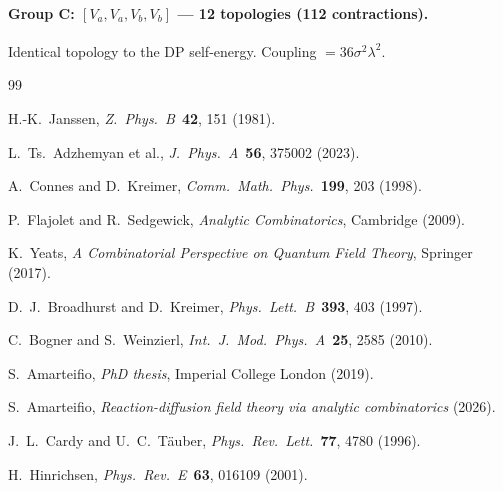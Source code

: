 \documentclass[11pt,a4paper]{article}
\theoremstyle{definition}
\begin{document}
\paragraph{Group C: $[V_a, V_a, V_b, V_b]$ --- 12 topologies (112 contractions).}
Identical topology to the DP self-energy. Coupling $= 36\sigma^2\lambda^2$.


\begin{thebibliography}{99}

H.-K.~Janssen,
\emph{Z.\ Phys.\ B}\ \textbf{42}, 151 (1981).

L.~Ts.~Adzhemyan et al.,
\emph{J.\ Phys.\ A}\ \textbf{56}, 375002 (2023).

A.~Connes and D.~Kreimer,
\emph{Comm.\ Math.\ Phys.}\ \textbf{199}, 203 (1998).

P.~Flajolet and R.~Sedgewick,
\emph{Analytic Combinatorics}, Cambridge (2009).

K.~Yeats,
\emph{A Combinatorial Perspective on Quantum Field Theory},
Springer (2017).

D.~J.~Broadhurst and D.~Kreimer,
\emph{Phys.\ Lett.\ B}\ \textbf{393}, 403 (1997).

C.~Bogner and S.~Weinzierl,
\emph{Int.\ J.\ Mod.\ Phys.\ A}\ \textbf{25}, 2585 (2010).

S.~Amarteifio, \emph{PhD thesis}, Imperial College London (2019).

S.~Amarteifio, \emph{Reaction-diffusion field theory via analytic
combinatorics} (2026).

J.~L.~Cardy and U.~C.~T\"auber,
\emph{Phys.\ Rev.\ Lett.}\ \textbf{77}, 4780 (1996).

H.~Hinrichsen,
\emph{Phys.\ Rev.\ E}\ \textbf{63}, 016109 (2001).

\end{thebibliography}
\end{document}
